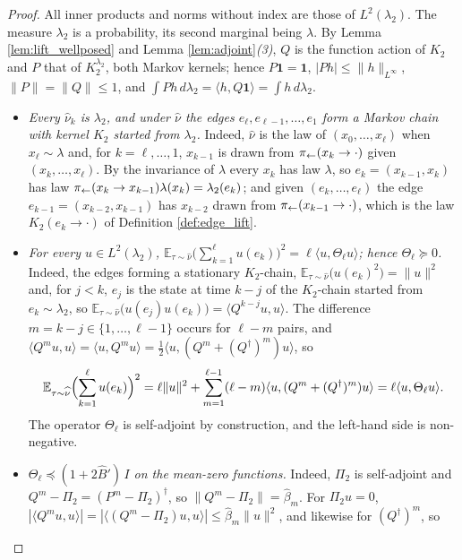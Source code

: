 \begin{proof}
All inner products and norms without index are those of $L^2(\lambda_2)$. The measure $\lambda_2$ is a probability, its second marginal being $\lambda$. By Lemma \ref{lem:lift_wellposed} and Lemma \ref{lem:adjoint}\emph{(3)}, $Q$ is the function action of $K_2$ and $P$ that of $K_2^{\lambda_2}$, both Markov kernels; hence $P\mathbf 1=\mathbf 1$, $|Ph|\leq\|h\|_{L^\infty}$, $\|P\|=\|Q\|\leq1$, and $\int Ph\,d\lambda_2=\langle h,Q\mathbf 1\rangle=\int h\,d\lambda_2$.
\begin{itemize}
    \item \emph{Every $\widehat\nu_k$ is $\lambda_2$, and under $\widehat\nu$ the edges $e_\ell,e_{\ell-1},\dots,e_1$ form a Markov chain with kernel $K_2$ started from $\lambda_2$.} Indeed, $\widehat\nu$ is the law of $(x_0,\dots,x_\ell)$ when $x_\ell\sim\lambda$ and, for $k=\ell,\dots,1$, $x_{k-1}$ is drawn from $\pi_{\leftarrow}(x_k\rightarrow\cdot)$ given $(x_k,\dots,x_\ell)$. By the invariance of $\lambda$ every $x_k$ has law $\lambda$, so $e_k=(x_{k-1},x_k)$ has law $\pi_{\leftarrow}(x_k\rightarrow x_{k-1})\lambda(x_k)=\lambda_2(e_k)$; and given $(e_k,\dots,e_\ell)$ the edge $e_{k-1}=(x_{k-2},x_{k-1})$ has $x_{k-2}$ drawn from $\pi_{\leftarrow}(x_{k-1}\rightarrow\cdot)$, which is the law $K_2(e_k\rightarrow\cdot)$ of Definition \ref{def:edge_lift}.
    \item \emph{For every $u\in L^2(\lambda_2)$, $\mathbb E_{\tau\sim\widehat\nu}\bigl(\sum_{k=1}^\ell u(e_k)\bigr)^2=\ell\langle u,\Theta_\ell u\rangle$; hence $\Theta_\ell\succeq0$.} Indeed, the edges forming a stationary $K_2$-chain, $\mathbb E_{\tau\sim\widehat\nu}\bigl(u(e_k)^2\bigr)=\|u\|^2$ and, for $j<k$, $e_j$ is the state at time $k-j$ of the $K_2$-chain started from $e_k\sim\lambda_2$, so $\mathbb E_{\tau\sim\widehat\nu}\bigl(u(e_j)u(e_k)\bigr)=\langle Q^{k-j}u,u\rangle$. The difference $m=k-j\in\{1,\dots,\ell-1\}$ occurs for $\ell-m$ pairs, and $\langle Q^mu,u\rangle=\langle u,Q^mu\rangle=\frac12\langle u,(Q^m+(Q^\dagger)^m)u\rangle$, so
    \begin{equation}\label{eq:tb_window_variance}
        \mathbb E_{\tau\sim\widehat\nu}\Bigl(\sum_{k=1}^\ell u(e_k)\Bigr)^2=\ell\|u\|^2+\sum_{m=1}^{\ell-1}(\ell-m)\langle u,(Q^m+(Q^\dagger)^m)u\rangle=\ell\langle u,\Theta_\ell u\rangle .
    \end{equation}
    The operator $\Theta_\ell$ is self-adjoint by construction, and the left-hand side is non-negative.
    \item \emph{$\Theta_\ell\preceq(1+2\widehat B')\,I$ on the mean-zero functions.} Indeed, $\Pi_2$ is self-adjoint and $Q^m-\Pi_2=(P^m-\Pi_2)^\dagger$, so $\|Q^m-\Pi_2\|=\widehat\beta_m$. For $\Pi_2u=0$, $|\langle Q^mu,u\rangle|=|\langle(Q^m-\Pi_2)u,u\rangle|\leq\widehat\beta_m\|u\|^2$, and likewise for $(Q^\dagger)^m$, so

\end{itemize}
\end{proof}

